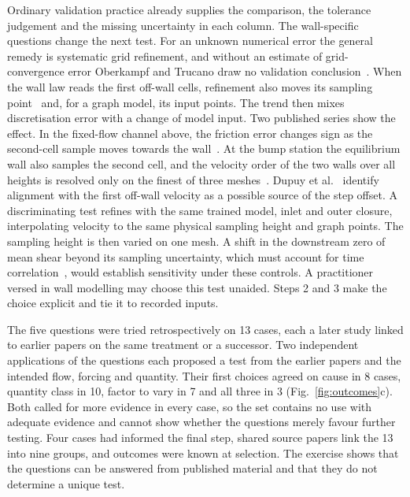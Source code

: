 \documentclass[pdflatex,sn-nature,iicol]{sn-jnl}
\begin{document}
Ordinary validation practice already supplies the comparison, the tolerance judgement and the missing uncertainty in each column. The wall-specific questions change the next test. For an unknown numerical error the general remedy is systematic grid refinement, and without an estimate of grid-convergence error Oberkampf and Trucano draw no validation conclusion~\cite{OberkampfTrucano2002}. When the wall law reads the first off-wall cells, refinement also moves its sampling point~\cite{KawaiLarsson2012,Larsson2016} and, for a graph model, its input points. The trend then mixes discretisation error with a change of model input. Two published series show the effect. In the fixed-flow channel above, the friction error changes sign as the second-cell sample moves towards the wall~\cite{MukhaBensow2021}. At the bump station the equilibrium wall also samples the second cell, and the velocity order of the two walls over all heights is resolved only on the finest of three meshes~\cite{DiZhou2024}. Dupuy et al.~\cite{Dupuy2023graph} identify alignment with the first off-wall velocity as a possible source of the step offset. A discriminating test refines with the same trained model, inlet and outer closure, interpolating velocity to the same physical sampling height and graph points. The sampling height is then varied on one mesh. A shift in the downstream zero of mean shear beyond its sampling uncertainty, which must account for time correlation~\cite{Oliver2014}, would establish sensitivity under these controls. A practitioner versed in wall modelling may choose this test unaided. Steps 2 and 3 make the choice explicit and tie it to recorded inputs.

The five questions were tried retrospectively on 13 cases, each a later study linked to earlier papers on the same treatment or a successor. Two independent applications of the questions each proposed a test from the earlier papers and the intended flow, forcing and quantity. Their first choices agreed on cause in 8 cases, quantity class in 10, factor to vary in 7 and all three in 3 (Fig.~\ref{fig:outcomes}c). Both called for more evidence in every case, so the set contains no use with adequate evidence and cannot show whether the questions merely favour further testing. Four cases had informed the final step, shared source papers link the 13 into nine groups, and outcomes were known at selection. The exercise shows that the questions can be answered from published material and that they do not determine a unique test.
\end{document}
